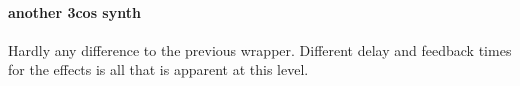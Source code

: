 \paragraph{another 3cos synth}
Hardly any difference to the previous wrapper. Different
delay and feedback times for the effects is all that is
apparent at this level.
